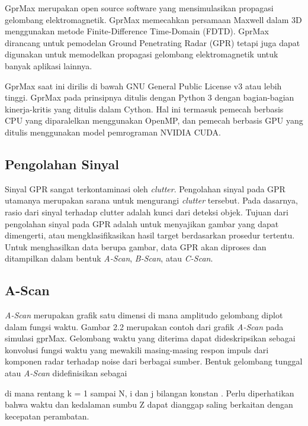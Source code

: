 GprMax merupakan open source software yang mensimulasikan propagasi gelombang elektromagnetik. 
GprMax memecahkan persamaan Maxwell dalam 3D menggunakan metode Finite-Difference Time-Domain (FDTD). 
GprMax dirancang untuk pemodelan Ground Penetrating Radar (GPR) tetapi juga dapat digunakan untuk memodelkan propagasi gelombang elektromagnetik untuk banyak aplikasi lainnya. 

GprMax saat ini dirilis di bawah GNU General Public License v3 atau lebih tinggi. 
GprMax pada prinsipnya ditulis dengan Python 3 dengan bagian-bagian kinerja-kritis yang ditulis dalam Cython. 
Hal ini termasuk pemecah berbasis CPU yang diparalelkan menggunakan OpenMP, dan pemecah berbasis GPU yang ditulis menggunakan model pemrograman NVIDIA CUDA. \parencite{gprMax}

\subsection{Pengolahan Sinyal}
\label{subsec:pengolahanSinyal}

Sinyal GPR sangat terkontaminasi oleh \emph{clutter}. 
Pengolahan sinyal pada GPR utamanya merupakan sarana untuk mengurangi \emph{clutter} tersebut. 
Pada dasarnya, rasio dari sinyal terhadap clutter adalah kunci dari deteksi objek. 
Tujuan dari pengolahan sinyal pada GPR adalah untuk menyajikan gambar yang dapat dimengerti, atau mengklasifikasikan hasil target berdasarkan prosedur tertentu. 
Untuk menghasilkan data berupa gambar, data GPR akan diproses dan ditampilkan dalam bentuk \emph{A-Scan}, \emph{B-Scan}, atau \emph{C-Scan}.

\subsection{A-Scan}
\label{subsec:aScan}

\emph{A-Scan} merupakan grafik satu dimensi di mana amplitudo gelombang diplot dalam fungsi waktu. 
Gambar 2.2 merupakan contoh dari grafik \emph{A-Scan} pada simulasi gprMax. 
Gelombang waktu yang diterima dapat dideskripsikan sebagai konvolusi fungsi waktu yang mewakili masing-masing respon impuls dari komponen radar terhadap noise dari berbagai sumber. 
Bentuk gelombang tunggal atau \emph{A-Scan} didefinisikan sebagai

di mana rentang k = 1 sampai N, i dan j bilangan konstan \parencite{danielDvd}.
Perlu diperhatikan bahwa waktu dan kedalaman sumbu Z dapat dianggap saling berkaitan dengan kecepatan perambatan.

